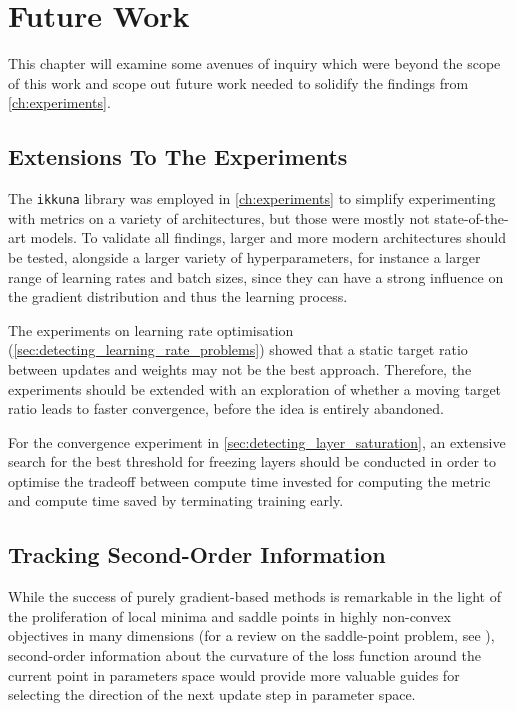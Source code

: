 \chapter{Future Work}%
\label{cha:future_work}

This chapter will examine some avenues of inquiry which were beyond the scope of
this work and scope out future work needed to solidify the findings from
\cref{ch:experiments}.

\section{Extensions To The Experiments}

The \texttt{ikkuna} library was employed in \cref{ch:experiments} to simplify
experimenting with metrics on a variety of architectures, but those were mostly
not state-of-the-art models. To validate all findings, larger and more modern
architectures should be tested, alongside a larger variety of hyperparameters,
for instance a larger range of learning rates and batch sizes, since they can
have a strong influence on the gradient distribution and thus the learning
process.

The experiments on learning rate optimisation
(\cref{sec:detecting_learning_rate_problems}) showed that a static target ratio
between updates and weights may not be the best approach.  Therefore, the
experiments should be extended with an exploration of whether a moving target
ratio leads to faster convergence, before the idea is entirely abandoned.

For the convergence experiment in \cref{sec:detecting_layer_saturation}, an
extensive search for the best threshold for freezing layers should be conducted
in order to optimise the tradeoff between compute time invested for computing
the metric and compute time saved by terminating training early.

\section{Tracking Second-Order Information}%
\label{sec:tracking_second_order_information}

While the success of purely gradient-based methods is remarkable in the
light of the proliferation of local minima and saddle points in highly
non-convex objectives in many dimensions (for a review on the saddle-point problem, see
\citet{dauphin2014identifying}), second-order information about the curvature of
the loss function around the current point in parameters space would provide
more valuable guides for selecting the direction of the next update step in
parameter space.

